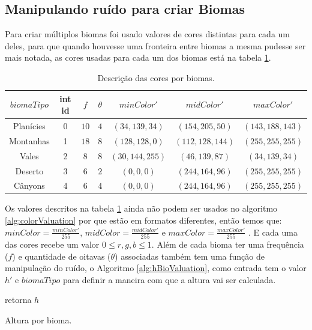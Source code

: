 \subsection{Manipulando ruído para criar Biomas}
Para criar múltiplos biomas foi usado valores de cores distintas para cada um deles, 
para que quando houvesse uma fronteira entre biomas a mesma pudesse ser mais notada, as
cores usadas para cada um dos biomas está na tabela \ref{tab:bioColors}.
\begin{table}[H]
    \centering
    \caption{Descrição das cores por biomas.}
    \label{tab:bioColors}
    \begin{tabular}{| c | c c c c c c|}
        \hline
        $biomaTipo$ & int id & $f$ & $\theta$ & $minColor'$ & $midColor'$ & $maxColor'$\\
        \hline
        Planícies   & 0 & $10$ & $4$ & $(34, 139, 34) $ & $(154, 205, 50) $ & $(143,188,143)  $  \\
        Montanhas & 1 & $18$ & $8$ & $(128, 128, 0) $ & $(112, 128, 144)$ & $(255, 255, 255)$  \\
        Vales   & 2 & $8$  & $8$ & $(30, 144, 255)$ & $(46, 139, 87)  $ & $(34, 139, 34)  $  \\
        Deserto   & 3 & $6$  & $2$ & $(0, 0, 0)     $ & $(244, 164, 96) $ & $(255, 255, 255)$  \\
        Cânyons  & 4 & $6$  & $4$ & $(0, 0, 0)     $ & $(244, 164, 96) $ & $(255, 255, 255)$  \\
        \hline
    \end{tabular}
\end{table}

Os valores descritos na tabela \ref{tab:bioColors} ainda não podem ser usados no
algoritmo \ref{alg:colorValuation} por que estão em formatos diferentes, então temos
que: $minColor = \frac{minColor'}{255}$, $midColor = \frac{midColor'}{255}$ e $maxColor = \frac{maxColor'}{255}$ . E cada uma das cores recebe um valor
$0 \leq r, g, b \leq 1$.
Além de cada bioma ter uma frequência ($f$) e quantidade de oitavas ($\theta$) associadas
também tem uma função de manipulação do ruído, o Algoritmo \ref{alg:hBioValuation}, 
como entrada tem o valor $h'$ e $biomaTipo$ para definir a maneira com que a altura vai ser
calculada.

\begin{algorithm}[H]\label{alg:hBioValuation}
    retorna $h$\;
    \caption{Altura por bioma.}
\end{algorithm}

